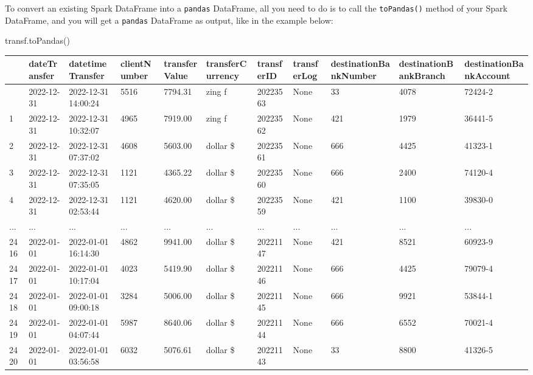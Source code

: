 \documentclass[
  11pt,
  letterpaper,
  DIV=11,
  numbers=noendperiod]{scrreprt}
\newenvironment{Shaded}{\begin{snugshade}}{\end{snugshade}}
\newcommand{\NormalTok}[1]{\textcolor[rgb]{0.00,0.23,0.31}{#1}}
\begin{document}
To convert an existing Spark DataFrame into a \texttt{pandas} DataFrame,
all you need to do is to call the \texttt{toPandas()} method of your
Spark DataFrame, and you will get a \texttt{pandas} DataFrame as output,
like in the example below:

\begin{Shaded}
\begin{Highlighting}[]
\NormalTok{transf.toPandas()}
\end{Highlighting}
\end{Shaded}

\begin{longtable}[]{@{}lllllllllll@{}}
\toprule\noalign{}
& dateTransfer & datetimeTransfer & clientNumber & transferValue &
transferCurrency & transferID & transferLog & destinationBankNumber &
destinationBankBranch & destinationBankAccount \\
\midrule\noalign{}
\endhead
\bottomrule\noalign{}
\endlastfoot
0 & 2022-12-31 & 2022-12-31 14:00:24 & 5516 & 7794.31 & zing ƒ &
20223563 & None & 33 & 4078 & 72424-2 \\
1 & 2022-12-31 & 2022-12-31 10:32:07 & 4965 & 7919.00 & zing ƒ &
20223562 & None & 421 & 1979 & 36441-5 \\
2 & 2022-12-31 & 2022-12-31 07:37:02 & 4608 & 5603.00 & dollar \$ &
20223561 & None & 666 & 4425 & 41323-1 \\
3 & 2022-12-31 & 2022-12-31 07:35:05 & 1121 & 4365.22 & dollar \$ &
20223560 & None & 666 & 2400 & 74120-4 \\
4 & 2022-12-31 & 2022-12-31 02:53:44 & 1121 & 4620.00 & dollar \$ &
20223559 & None & 421 & 1100 & 39830-0 \\
... & ... & ... & ... & ... & ... & ... & ... & ... & ... & ... \\
2416 & 2022-01-01 & 2022-01-01 16:14:30 & 4862 & 9941.00 & dollar \$ &
20221147 & None & 421 & 8521 & 60923-9 \\
2417 & 2022-01-01 & 2022-01-01 10:17:04 & 4023 & 5419.90 & dollar \$ &
20221146 & None & 666 & 4425 & 79079-4 \\
2418 & 2022-01-01 & 2022-01-01 09:00:18 & 3284 & 5006.00 & dollar \$ &
20221145 & None & 666 & 9921 & 53844-1 \\
2419 & 2022-01-01 & 2022-01-01 04:07:44 & 5987 & 8640.06 & dollar \$ &
20221144 & None & 666 & 6552 & 70021-4 \\
2420 & 2022-01-01 & 2022-01-01 03:56:58 & 6032 & 5076.61 & dollar \$ &
20221143 & None & 33 & 8800 & 41326-5 \\
\end{longtable}
\end{document}
